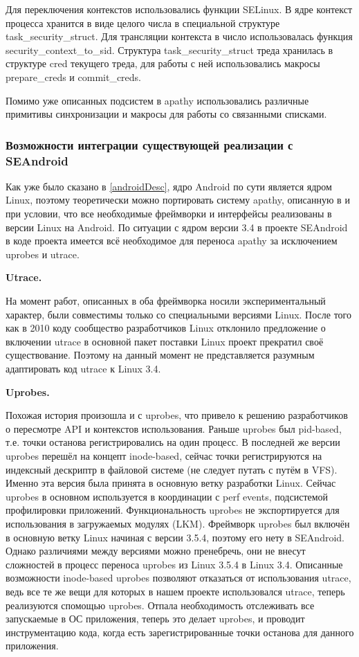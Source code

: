 Для переключения контекстов использовались функции SELinux. В ядре
контекст процесса хранится в виде целого числа в специальной структуре
task\_security\_struct. Для трансляции контекста в число использовалась
функция security\_context\_to\_sid. Структура task\_security\_struct
треда хранилась в структуре cred текущего треда, для работы с ней
использовались макросы prepare\_creds и commit\_creds.

Помимо уже описанных подсистем в apathy использовались различные
примитивы синхронизации и макросы для работы со связанными списками.

\subsubsection{Возможности интеграции существующей реализации с
SEAndroid}

Как уже было сказано в \ref{androidDesc}, ядро Android по сути является
ядром Linux, поэтому теоретически можно портировать систему apathy,
описанную в \cite{sacharov} и \cite{bush} при условии, что все
необходимые фреймворки и интерфейсы реализованы в версии Linux на
Android. По ситуации с ядром версии 3.4 в проекте SEAndroid в коде
проекта имеется всё необходимое для переноса apathy за исключением
uprobes и utrace. 

\bigskip
{\bfseries Utrace.}

\bigskip
На момент работ, описанных в \cite{sacharov} оба фреймворка носили
экспериментальный характер, были совместимы только со специальными
версиями Linux. После того как в 2010 коду сообщество разработчиков
Linux отклонило предложение о включении utrace в основной пакет поставки
Linux проект прекратил своё существование. Поэтому на данный момент не
представляется разумным адаптировать код utrace к Linux 3.4. 

\bigskip
{\bfseries Uprobes.}

\bigskip
Похожая история произошла и с uprobes, что привело к решению
разработчиков о пересмотре API и контекстов использования. Раньше
uprobes был pid-based, т.е. точки останова регистрировались на один
процесс. В последней же версии uprobes перешёл на концепт inode-based,
сейчас точки регистрируются на индексный дескриптр в файловой системе
(не следует путать с путём в VFS).  Именно эта версия была принята в
основную ветку разработки Linux. Сейчас uprobes в основном используется
в координации с perf events, подсистемой профилировки приложений.
Функциональность uprobes не экспортируется для использования в
загружаемых модулях (LKM).  Фреймворк uprobes был включён в основную
ветку Linux начиная с версии 3.5.4, поэтому его нету в SEAndroid. Однако
различиями между версиями можно пренебречь, они не внесут сложностей в
процесс переноса uprobes из Linux 3.5.4 в Linux 3.4. Описанные
возможности inode-based uprobes позволяют отказаться от использования
utrace, ведь все те же вещи для которых в нашем проекте использовался
utrace, теперь реализуются спомощью uprobes. Отпала необходимость
отслеживать все запускаемые в ОС приложения, теперь это делает uprobes,
и проводит инструментацию кода, когда есть зарегистрированные точки
останова для данного приложения.


